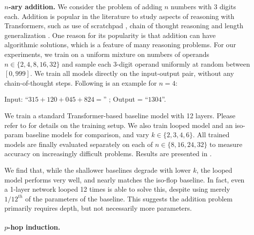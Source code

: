 \textbf{$n$-ary addition.}
\label{sec:addition}
We consider the problem of adding $n$ numbers with 3 digits each. Addition is popular in the literature to study aspects of reasoning with Transformers, such as use of scratchpad \citep{nye2021show}, chain of thought reasoning \citep{lee2024teaching,li2024chain} and length generalization \citep{cho2024position}.
One reason for its popularity is that addition can have algorithmic solutions, which is a feature of many reasoning problems.
For our experiments, we train on a uniform mixture on numbers of operands $n\in\{2, 4, 8, 16, 32\}$ and sample each 3-digit operand uniformly at random between $[0, 999]$. We train all models directly on the input-output pair, without any chain-of-thought steps. Following is an example for $n=4$:
\vspace{-0.05in}
\begin{center}
    Input: ``$315 + 120 + 045 + 824 = $''  ; Output = ``$1304$''.
\end{center}
\vspace{-0.05in}
We train a standard Transformer-based baseline  model with 12 layers. Please refer to  for details on the training setup. We also train  looped model and an iso-param  baseline models for comparison, and vary $k \in \{2, 3, 4, 6\}$. All trained models are finally evaluated separately on each of $n\in\{8, 16, 24, 32\}$ to measure accuracy on increasingly difficult problems. Results are presented in .

% 




We find that, while the shallower baselines  degrade with lower $k$, the looped model  performs very well, and nearly matches the iso-flop  baseline. In fact, even a 1-layer network looped 12 times is able to solve this, despite using merely $1/12^{th}$ of the parameters of the baseline. This suggests the addition problem primarily requires depth, but not necessarily more parameters.

\vspace{-0.05in}
\paragraph{$p$-hop induction.}
\label{sec:khop_desc}

